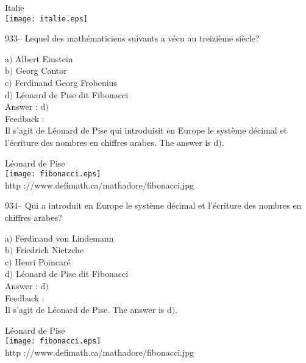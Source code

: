 \documentclass[letterpaper, 12pt]{article}
\begin{document}
        \begin{center}
        Italie\\
    \texttt{[image: italie.eps]}\\
    \end{center}

933-- Lequel des math\'ematiciens suivants a v\'ecu au treizi\`eme
si\`ecle?

a$)$ Albert Einstein \\
b$)$ Georg Cantor \\
c$)$ Ferdinand Georg Frobenius \\
d$)$ L\'eonard de Pise dit Fibonacci\\

Answer : d$)$\\

Feedback :\\
Il s'agit de L\'eonard de Pise qui introduisit en Europe le
syst\`eme d\'ecimal et l'\'ecriture
des nombres en chiffres arabes. The answer is d$)$.\\

        \begin{center}
        L\'eonard de Pise\\
    \texttt{[image: fibonacci.eps]}\\
        {\footnotesize http ://www.defimath.ca/mathadore/fibonacci.jpg}
    \end{center}

934-- Qui a introduit en Europe le syst\`eme d\'ecimal et
l'\'ecriture des nombres en chiffres arabes?

a$)$ Ferdinand von Lindemann \\
b$)$ Friedrich Nietzche \\
c$)$ Henri Poincar\'e \\
d$)$ L\'eonard de Pise dit Fibonacci\\

Answer : d$)$\\

Feedback : \\
Il s'agit de L\'eonard de Pise. The answer is d$)$.

        \begin{center}
        L\'eonard de Pise\\
    \texttt{[image: fibonacci.eps]}\\
        {\footnotesize http ://www.defimath.ca/mathadore/fibonacci.jpg}
    \end{center}
\end{document}
